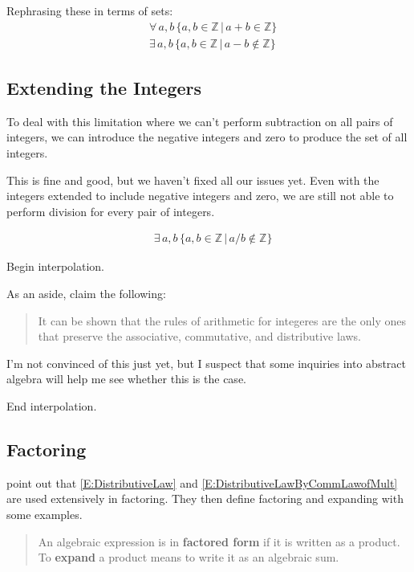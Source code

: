 \documentclass[leqno]{article}
\numberwithin{equation}{section}
\begin{document}
Rephrasing these in terms of sets:
\begin{align}
    &\forall \, a, b \, \{a, b \in \mathbb{Z} \,|\, a+b \in \mathbb{Z}\}\\
    &\exists \, a, b \, \{a, b \in \mathbb{Z} \,|\, a-b \not\in \mathbb{Z}\}
\end{align}

\subsection{Extending the Integers}

To deal with this limitation
where we can't perform subtraction on all pairs of integers,
we can introduce the negative integers and zero
to produce the set of all integers.

This is fine and good, but we haven't fixed all our issues yet.
Even with the integers extended to include negative integers and zero,
we are still not able to perform division for every pair of integers.

\begin{align}
    &\exists \, a, b \, \{a, b \in \mathbb{Z} \,|\, a/b \not\in \mathbb{Z}\}
\end{align}

\newpage
Begin interpolation.

As an aside, \citeauthor{fisherIntegratedAlgebraTrigonometry1962} claim the following:
\begin{quote}
    It can be shown that the rules of arithmetic
    for integeres are the only ones that preserve
    the associative, commutative, and distributive
    laws.
\end{quote}

I'm not convinced of this just yet, but I suspect that some inquiries into abstract algebra will help me see whether this is the case.

End interpolation.

\subsection{Factoring}

\citeauthor{fisherIntegratedAlgebraTrigonometry1962} point out that
\eqref{E:DistributiveLaw} and \eqref{E:DistributiveLawByCommLawofMult}
are used extensively in factoring.
They then define factoring and expanding with some examples.

\begin{quote}
    An algebraic expression is in \textbf{factored form} if it is written as a product.
    To \textbf{expand} a product means to write it as an algebraic sum.
\end{quote}
\end{document}
